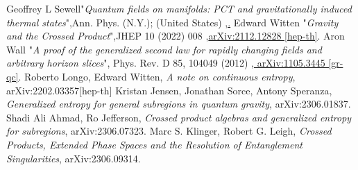 \documentclass[12pt]{article}
\begin{document}
\begin{thebibliography}{100}
 Geoffrey L Sewell"\textit{Quantum fields on manifolds: PCT and gravitationally induced thermal states}",Ann. Phys. (N.Y.); (United States) ,\href{https://www.osti.gov/biblio/6713432}.
  Edward Witten "\textit{Gravity and the Crossed Product}",JHEP 10 (2022) 008  ,\href{https://arxiv.org/abs/2112.12828}{arXiv:2112.12828 [hep-th]}.
  Aron Wall "\textit{A proof of the generalized second law for rapidly changing fields and arbitrary horizon slices}", Phys. Rev. D 85, 104049 (2012) ,\href{https://arxiv.org/abs/1105.3445}{	arXiv:1105.3445 [gr-qc]}.
 Roberto Longo, Edward Witten, \emph{A note on continuous entropy}, {arXiv:2202.03357[hep-th]}
  Kristan Jensen, Jonathan Sorce, Antony Speranza, \emph{Generalized entropy for general subregions in quantum gravity}, arXiv:2306.01837.
 Shadi Ali Ahmad, Ro Jefferson, \emph{Crossed product algebras and generalized entropy for subregions},  	 arXiv:2306.07323.
  Marc S. Klinger, Robert G. Leigh, \emph{Crossed Products, Extended Phase Spaces and the Resolution of Entanglement Singularities}, arXiv:2306.09314.
\end{thebibliography}
\end{document}
